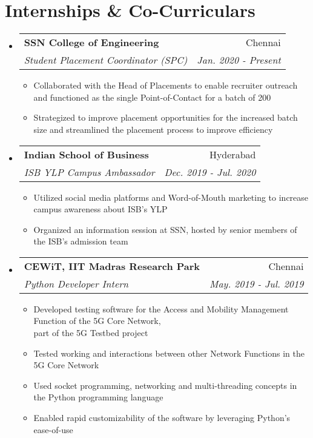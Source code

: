 \documentclass[letterpaper,11pt]{article}
\makeatletter
\newcommand{\resumeItem}[2]{
\item\small{
\textbf{#1}{ #2 \vspace{-2pt} }
}
}
\newcommand{\resumeSubheading}[4]{
\vspace{-1pt}\item
\begin{tabular*}{0.97\textwidth}{l@{\extracolsep{\fill}}r}
\textbf{#1} & #2 \\
\textit{\small#3} & \textit{\small #4} \\
\end{tabular*}\vspace{-5pt}
}
\newcommand{\resumeSubHeadingListStart}{\begin{itemize}[leftmargin=*]}
\newcommand{\resumeSubHeadingListEnd}{\end{itemize}}
\newcommand{\resumeItemListStart}{\begin{itemize}}
\newcommand{\resumeItemListEnd}{\end{itemize}\vspace{-5pt}}
\makeatother
\begin{document}
\section{Internships \& Co-Curriculars}
\resumeSubHeadingListStart
\resumeSubheading
{SSN College of Engineering}{Chennai}
{Student Placement Coordinator (SPC)}{Jan. 2020 - Present}
\resumeItemListStart
\resumeItem{}{\hspace{-7pt} Collaborated with the Head of Placements to enable recruiter outreach and functioned as the single Point-of-Contact for a batch of 200}
\resumeItem{}{\hspace{-7pt} Strategized to improve placement opportunities for the increased batch size and streamlined the placement process to improve efficiency}
\resumeItemListEnd
\resumeSubHeadingListEnd
\resumeSubHeadingListStart
\resumeSubheading
{Indian School of Business}{Hyderabad}
{ISB YLP Campus Ambassador}{Dec. 2019 - Jul. 2020}
\resumeItemListStart
\resumeItem{}{\hspace{-7pt} Utilized social media platforms and Word-of-Mouth marketing to increase campus awareness about ISB's YLP}
\resumeItem{}{\hspace{-7pt} Organized an information session at SSN, hosted by senior members of the ISB's admission team}
\resumeItemListEnd
\resumeSubHeadingListEnd
\resumeSubHeadingListStart
\resumeSubheading
{CEWiT, IIT Madras Research Park}{Chennai}
{Python Developer Intern}{May. 2019 - Jul. 2019}
\resumeItemListStart
\resumeItem{}{\hspace{-7pt} Developed testing software for the Access and Mobility Management Function of the 5G Core Network, \\
part of the 5G Testbed project}
\resumeItem{}{\hspace{-7pt} Tested working and interactions between other Network Functions in the 5G Core Network}
\resumeItem{}{\hspace{-7pt} Used socket programming, networking and multi-threading concepts in the Python programming language}
\resumeItem{}{\hspace{-7pt} Enabled rapid customizability of the software by leveraging Python's ease-of-use}
\resumeItemListEnd
\resumeSubHeadingListEnd
\end{document}
